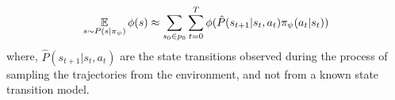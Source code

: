 \begin{align}
\label{eq:svf-sampling}
   \operatorname*{\mathbb{E}}_{s \sim P(s|\pi_\psi)} \phi(s) \approx \sum_{s_0 \in p_0} \sum_{t=0}^{T} \phi(\hat{P}(s_{t+1}|s_t, a_t)\pi_\psi(a_t|s_t))
\end{align}
where, $\hat{P}(s_{t+1}| s_{t}, a_{t})$ are the state transitions observed during the process of sampling the trajectories from the environment, and not from a known state transition model.

